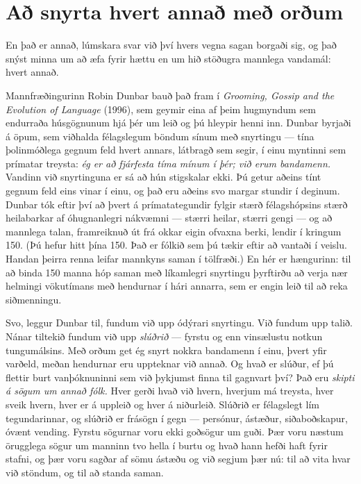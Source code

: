 \section*{Að snyrta hvert annað með orðum}

En það er annað, lúmskara svar við því hvers vegna sagan borgaði sig, og það snýst minna um að æfa fyrir hættu en um hið stöðugra mannlega vandamál: hvert annað.

Mannfræðingurinn Robin Dunbar bauð það fram í \emph{Grooming, Gossip and the Evolution of Language} (1996), sem geymir eina af þeim hugmyndum sem endurraða húsgögnunum hjá þér um leið og þú hleypir henni inn. Dunbar byrjaði á öpum, sem viðhalda félagslegum böndum sínum með snyrtingu — tína þolinmóðlega gegnum feld hvert annars, látbragð sem segir, í einu myntinni sem prímatar treysta: \emph{ég er að fjárfesta tíma mínum í þér; við erum bandamenn.} Vandinn við snyrtinguna er sá að hún stigskalar ekki. Þú getur aðeins tínt gegnum feld eins vinar í einu, og það eru aðeins svo margar stundir í deginum. Dunbar tók eftir því að þvert á prímatategundir fylgir stærð félagshópsins stærð heilabarkar af óhugnanlegri nákvæmni — stærri heilar, stærri gengi — og að mannlega talan, framreiknuð út frá okkar eigin ofvaxna berki, lendir í kringum 150. (Þú hefur hitt þína 150. Það er fólkið sem þú tækir eftir að vantaði í veislu. Handan þeirra renna leifar mannkyns saman í tölfræði.) En hér er hængurinn: til að binda 150 manna hóp saman með líkamlegri snyrtingu þyrftirðu að verja nær helmingi vökutímans með hendurnar í hári annarra, sem er engin leið til að reka siðmenningu.

Svo, leggur Dunbar til, fundum við upp ódýrari snyrtingu. Við fundum upp talið. Nánar tiltekið fundum við upp \emph{slúðrið} — fyrstu og enn vinsælustu notkun tungumálsins. Með orðum get ég snyrt nokkra bandamenn í einu, þvert yfir varðeld, meðan hendurnar eru uppteknar við annað. Og hvað er slúður, ef þú flettir burt vanþóknuninni sem við þykjumst finna til gagnvart því? Það eru \emph{skipti á sögum um annað fólk.} Hver gerði hvað við hvern, hverjum má treysta, hver sveik hvern, hver er á uppleið og hver á niðurleið. Slúðrið er félagslegt lím tegundarinnar, og slúðrið er frásögn í gegn — persónur, ástæður, siðaboðskapur, óvænt vending. Fyrstu sögurnar voru ekki goðsögur um guði. Þær voru næstum örugglega sögur um manninn tvo hella í burtu og hvað hann hefði haft fyrir stafni, og þær voru sagðar af sömu ástæðu og við segjum þær nú: til að vita hvar við stöndum, og til að standa saman.

